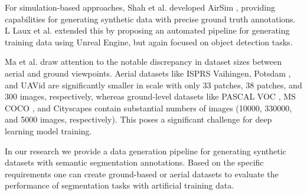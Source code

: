 \documentclass[../report.tex]{subfiles}
\begin{document}
    For simulation-based approaches, Shah et al. developed AirSim \cite{shah2018airsim}, providing capabilities for generating synthetic data with precise ground truth annotations.
    L Laux et al. \cite{laux2022build} extended this by proposing an automated pipeline for generating training data using Unreal Engine, but again focused on object detection tasks.
    
    Ma et al. \cite{ma2019deep} draw attention to the notable discrepancy in dataset sizes between aerial and ground viewpoints. Aerial datasets like ISPRS Vaihingen, Potsdam \cite{markus2014use}, and UAVid \cite{lyu2020uavid} are significantly smaller in scale with only 33 patches, 38 patches, and 300 images, respectively, whereas ground-level datasets like PASCAL VOC \cite{everingham2010pascal}, MS COCO \cite{lin2014microsoft}, and Cityscapes \cite{cordts2016cityscapes} contain substantial numbers of images (10000, 330000, and 5000 images, respectively). This poses a significant challenge for deep learning model training.

    In our research we provide a data generation pipeline for generating synthetic datasets with semantic segmentation annotations. Based on the specific requirements one can create ground-based or aerial datasets to evaluate the performance of segmentation tasks with artificial training data. 
\end{document}
